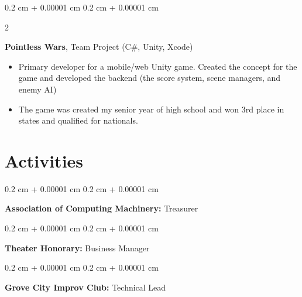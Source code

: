 \documentclass[10pt, letterpaper]{article}
\newenvironment{highlights}{
    \begin{itemize}[
        topsep=0.10 cm,
        parsep=0.10 cm,
        partopsep=0pt,
        itemsep=0pt,
        leftmargin=0.4 cm + 10pt
    ]
}{
    \end{itemize}
} %
\newenvironment{onecolentry}{
    \begin{adjustwidth}{
        0.2 cm + 0.00001 cm
    }{
        0.2 cm + 0.00001 cm
    }
}{
    \end{adjustwidth}
} %
\newenvironment{twocolentry}[2][]{
    \onecolentry
    \def\secondColumn{#2}
    \setcolumnwidth{\fill, 3.4 cm}
    \begin{paracol}{2}
}{
    \switchcolumn \raggedleft \secondColumn
    \end{paracol}
    \endonecolentry
} %
\begin{document}
        \begin{twocolentry}{
            2023
        }
            \textbf{Pointless Wars}, Team Project (C\#, Unity, Xcode)
            \begin{highlights}
                \item Primary developer for a mobile/web Unity game. Created the concept for the game and developed the backend (the score system, scene managers, and enemy AI)
                \item The game was created my senior year of high school and won 3rd place in states and qualified for nationals.
            \end{highlights}
        \end{twocolentry}



    
    \section{Activities}



        
        \begin{onecolentry}
            \textbf{Association of Computing Machinery:} Treasurer
        \end{onecolentry}

        \begin{onecolentry}
            \textbf{Theater Honorary:} Business Manager
        \end{onecolentry}

        \begin{onecolentry}
            \textbf{Grove City Improv Club:} Technical Lead
        \end{onecolentry}


    
\end{document}

